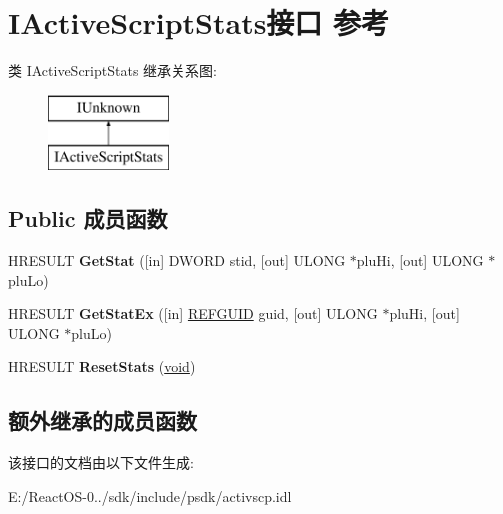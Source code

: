 \hypertarget{interface_i_active_script_stats}{}\section{I\+Active\+Script\+Stats接口 参考}
\label{interface_i_active_script_stats}
类 I\+Active\+Script\+Stats 继承关系图\+:\begin{figure}[H]
\begin{center}
\leavevmode
\includegraphics[height=2.000000cm]{interface_i_active_script_stats}
\end{center}
\end{figure}
\subsection*{Public 成员函数}
\begin{DoxyCompactItemize}
\item 
\mbox{\label{interface_i_active_script_stats_a35a823602616c179729b59fe71ae24d0}} 
H\+R\+E\+S\+U\+LT {\bfseries Get\+Stat} (\mbox{[}in\mbox{]} D\+W\+O\+RD stid, \mbox{[}out\mbox{]} U\+L\+O\+NG $\ast$plu\+Hi, \mbox{[}out\mbox{]} U\+L\+O\+NG $\ast$plu\+Lo)
\item 
\mbox{\label{interface_i_active_script_stats_ac93367323e0cb364924c6d1a488de6c2}} 
H\+R\+E\+S\+U\+LT {\bfseries Get\+Stat\+Ex} (\mbox{[}in\mbox{]} \hyperlink{struct___g_u_i_d}{R\+E\+F\+G\+U\+ID} guid, \mbox{[}out\mbox{]} U\+L\+O\+NG $\ast$plu\+Hi, \mbox{[}out\mbox{]} U\+L\+O\+NG $\ast$plu\+Lo)
\item 
\mbox{\label{interface_i_active_script_stats_a721449b7ff3539fdb0c627ec6864d97b}} 
H\+R\+E\+S\+U\+LT {\bfseries Reset\+Stats} (\hyperlink{interfacevoid}{void})
\end{DoxyCompactItemize}
\subsection*{额外继承的成员函数}


该接口的文档由以下文件生成\+:\begin{DoxyCompactItemize}
\item 
E\+:/\+React\+O\+S-\/0../sdk/include/psdk/activscp.\+idl\end{DoxyCompactItemize}
